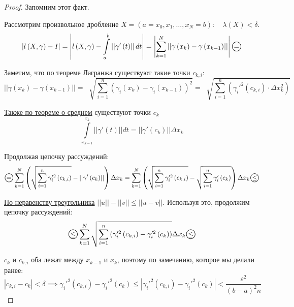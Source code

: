 \documentclass[../main.tex]{subfiles}
\begin{document}
\begin{proof}
    Запомним этот факт. 

    Рассмотрим произвольное дробление \( X=(a=x_0, x_1, \ldots , x_N=b):\quad \lambda \left( X\right)< \delta \). 
    \[ \left| l \left( X, \gamma \right)- I\right|=\left| l \left( X, \gamma \right)- \displaystyle\int\limits_{ a}^{ b} \left| \left| \gamma '\left( t\right)\right|\right|dt\right|=\left| \sum\limits_{ k=1}^{ N} \left| \left| \gamma \left( x_k\right)- \gamma \left( x_{k-1}\right)\right|\right|\right|\oeq\]

    Заметим, что по теореме Лагранжа существуют такие точки \( c_{k,i}\):
    \[ \left| \left| \gamma \left( x_k\right)- \gamma \left( x_{k-1}\right)\right|\right|= \;\sqrt[]{ \sum\limits_{ i=1}^{ n} \left( \gamma _i\left( x_k\right)- \gamma _i\left( x_{k-1}\right)\right)^2}= \;\sqrt[]{ \sum\limits_{ i=1}^{ n} \left( \gamma _i'^2 \left( c_{k,i}\right) \cdot \Delta x_k^2\right)}\]

    \hyperlink{thm:simple_average}{Также по теореме о среднем} существуют точки \( c_k\)
    \[ \displaystyle\int\limits_{ x_{k-1}}^{ x_k} \left| \left| \gamma '\left( t\right)\right|\right|dt=\left| \left| \gamma '\left( c_k\right)\right|\right| \Delta x_k\]

    Продолжая цепочку рассуждений:
    \begin{equation*}
        \begin{aligned}
            \oeq \sum\limits_{ k=1}^{ N} \left( \;\sqrt[]{ \sum\limits_{ i=1}^{ n} \gamma _i'^2\left( c_{k,i}\right)}-\left| \left| \gamma '\left( c_k\right)\right|\right|\right) \Delta x_k = \sum\limits_{ k=1}^{ N} \left( \;\sqrt[]{ \sum\limits_{ i=1}^{ n} \gamma _i'^2\left( c_{k,i}\right)}- \;\sqrt[]{ \sum\limits_{ i=1}^{ n} \gamma _i'\left( c_k\right)}\right) \Delta x_k \oleq
        \end{aligned}
    \end{equation*}

    \hyperlink{thm:minkovsky}{По неравенству треугольника} \( \left| \left| u\right|\right|-\left| \left| v\right|\right| \leq \left| \left| u-v\right|\right|\). Используя это, продолжим цепочку рассуждений: 
    \[ \oleq \sum\limits_{ k=1}^{ N} \;\sqrt[]{ \sum\limits_{ i=1}^{ n} \left( \gamma _i'^2\left( c_{k,i}\right)- \gamma _i'^2\left( c_k\right)\right)} \Delta x_k \oleq\]

    \( c_k\) и \( c_{k, i}\) оба лежат между \( x_{k-1}\) и \( x_k\), поэтому по замечанию, которое мы делали ранее:
    \[ \left| c_{k,i}-c_k\right| < \delta \implies \gamma _i'^2\left( c_{k,i}\right)- \gamma _i'^2\left( c_k\right) \leq \left|\gamma _i'^2\left( c_{k,i}\right)- \gamma _i'^2\left( c_k\right) \right| < \dfrac{ \varepsilon^2}{ \left( b-a\right)^2n} \]


\end{proof}
\end{document}
